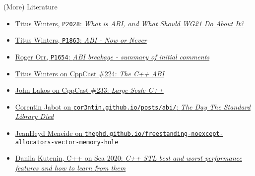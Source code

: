 \begin{frame}{(More) Literature}
    \begin{itemize}
        \item \href{http://www.open-std.org/jtc1/sc22/wg21/docs/papers/2020/p2028r0.pdf}{Titus Winters, \texttt{P2028}: \textit{What is ABI, and What Should \href{http://www.open-std.org/jtc1/sc22/wg21/}{WG21} Do About It?}}
        \item \href{http://www.open-std.org/jtc1/sc22/wg21/docs/papers/2020/p1863r1.pdf}{Titus Winters, \texttt{P1863}: \textit{ABI - Now or Never}}
        \item \href{http://open-std.org/JTC1/SC22/WG21/docs/papers/2020/p1654r1.html}{Roger Orr, \texttt{P1654}: \textit{ABI breakage - summary of initial comments}}
        \item \href{https://cppcast.com/titus-winters-abi/}{Titus Winters on CppCast \#224: \textit{The C++ ABI}}
        \item \href{https://cppcast.com/john-lakos-large-scale-cpp/}{John Lakos on CppCast \#233: \textit{Large Scale C++}}
        \item \href{https://cor3ntin.github.io/posts/abi/}{Corentin Jabot on \texttt{cor3ntin.github.io/posts/abi/}: \textit{The Day The Standard Library Died}}
        \item \href{https://thephd.github.io/freestanding-noexcept-allocators-vector-memory-hole}{JeanHeyd Meneide on \texttt{thephd.github.io/freestanding-noexcept-allocators-vector-memory-hole}}
        \item \href{https://youtu.be/GRuX31P4Ric}{Danila Kutenin, C++ on Sea 2020: \textit{C++ STL best and worst performance features and how to learn from them}}
    \end{itemize}
\end{frame}
